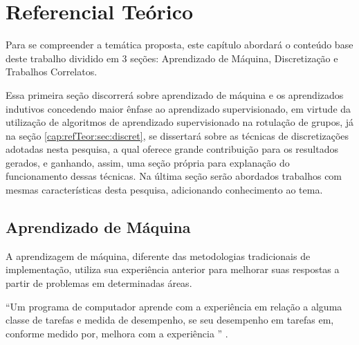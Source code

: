 \chapter{Referencial Teórico}\label{cap:refTeor}


Para se compreender a temática proposta, este capítulo abordará o conteúdo base deste trabalho dividido em 3 seções: Aprendizado de Máquina, Discretização e Trabalhos Correlatos. 

Essa primeira seção discorrerá sobre aprendizado de máquina e os aprendizados indutivos concedendo maior ênfase ao aprendizado supervisionado, em virtude da utilização de algoritmos de aprendizado supervisionado na rotulação de grupos, já na seção  \ref{cap:refTeor:sec:discret}, se dissertará sobre as técnicas de discretizações adotadas nesta pesquisa, a qual oferece grande contribuição para os resultados gerados, e ganhando, assim, uma seção própria para explanação do funcionamento dessas técnicas. Na última seção serão abordados trabalhos com mesmas características desta pesquisa, adicionando conhecimento ao tema. 



\section{Aprendizado de Máquina}\label{cap:refTeor:sec:aprendMaq}

A aprendizagem de máquina, diferente das metodologias tradicionais de implementação, utiliza sua experiência anterior para melhorar suas respostas a partir de problemas em determinadas áreas. 
 
 ``Um programa de computador aprende com a experiência  em relação a alguma classe de tarefas  e medida de desempenho, se seu desempenho em tarefas em, conforme medido por, melhora com a experiência '' \cite[p. 2]{Mitchell1997}. 
 
 


